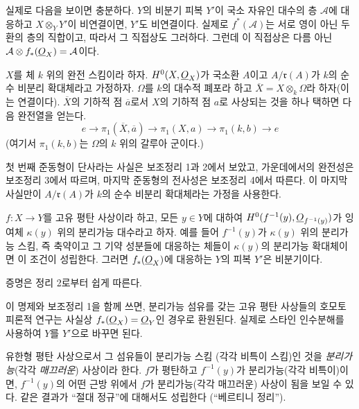 실제로 다음을 보이면 충분하다. $Y$의 비분기 피복 $Y'$이 국소 자유인
대수의 층 $\mathcal A$에 대응하고 $X\otimes_Y Y'$이 비연결이면,
$Y'$도 비연결이다. 실제로 $f^*(\mathcal A)$는 서로 영이 아닌 두 환의
층의 직합이고, 따라서 그 직접상도 그러하다. 그런데 이 직접상은 다름
아닌
$\mathcal A\otimes f_*(\underline{O}_X)=\mathcal A$이다.

 $X$를 체 $k$ 위의 완전 스킴이라 하자.
$H^0(X,\underline{O}_X)$가 국소환 $A$이고 $A/\mathfrak r(A)$가 $k$의 순수
비분리 확대체라고 가정하자. $\Omega$를 $k$의 대수적 폐포라 하고
$\overline X=X\otimes_k\Omega$라 하자(이는 연결이다). $\overline X$의
기하적 점 $\overline a$로서 $X$의 기하적 점 $a$로 사상되는 것을 하나
택하면 다음 완전열을 얻는다.
\[
  e\longrightarrow\pi_1(\overline X,\overline a)
  \longrightarrow\pi_1(X,a)
  \longrightarrow\pi_1(k,b)\longrightarrow e
\]
(여기서 $\pi_1(k,b)$는 $\Omega$의 $k$ 위의 갈루아 군이다.)

첫 번째 준동형이 단사라는 사실은 보조정리 1과 2에서 보았고, 가운데에서의
완전성은 보조정리 3에서 따르며, 마지막 준동형의 전사성은 보조정리 4에서
따른다. 이 마지막 사실만이 $A/\mathfrak r(A)$가 $k$의 순수 비분리
확대체라는 가정을 사용한다.

 $f:X\longrightarrow Y$를 고유 평탄 사상이라 하고,
모든 $y\in Y$에 대하여
$H^0(f^{-1}(y),\underline{O}_{f^{-1}(y)})$가 잉여체 $\kappa(y)$ 위의 분리가능
대수라고 하자. 예를 들어 $f^{-1}(y)$가 $\kappa(y)$ 위의 분리가능
스킴, 즉 축약이고 그 기약 성분들에 대응하는 체들이 $\kappa(y)$의
분리가능 확대체이면 이 조건이 성립한다. 그러면 $f_*(\underline{O}_X)$에
대응하는 $Y$의 피복 $Y'$은 비분기이다.

증명은 정리 2로부터 쉽게 따른다.

이 명제와 보조정리 1을 함께 쓰면, 분리가능 섬유를 갖는 고유 평탄
사상들의 호모토피론적 연구는 사실상 $f_*(\underline{O}_X)=\underline{O}_Y$인 경우로
환원된다. 실제로 스타인 인수분해를 사용하여 $Y$를 $Y'$으로 바꾸면 된다.

 유한형 평탄 사상으로서 그 섬유들이 분리가능 스킴
(각각 비특이 스킴)인 것을 \emph{분리가능}(각각 \emph{매끄러운})
사상이라 한다. $f$가 평탄하고 $f^{-1}(y)$가 분리가능(각각 비특이)이면,
$f^{-1}(y)$의 어떤 근방 위에서 $f$가 분리가능(각각 매끄러운) 사상이
됨을 보일 수 있다. 같은 결과가 “절대 정규”에 대해서도 성립한다
(“베르티니 정리”).

